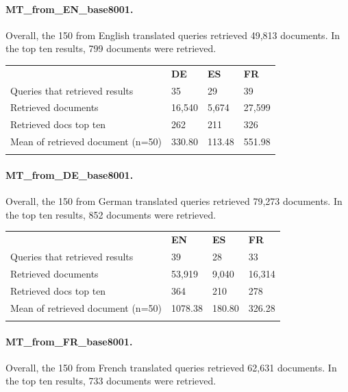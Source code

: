 \documentclass[a4paper,11pt]{article}
\begin{document}
\paragraph{MT\_from\_EN\_base8001.}
Overall, the 150 from English translated queries retrieved 49,813 documents. In the top ten results, 799 documents were retrieved.

\begin{table}[h]
\centering
\begin{tabularx}{0.81\textwidth}{llll}
\cmidrule{1-4}
\addlinespace
& \textbf{DE} & \textbf{ES} & \textbf{FR} \\
\addlinespace
\cmidrule{1-4}
\addlinespace
Queries that retrieved results & 35 & 29 & 39 \\
Retrieved documents & 16,540 & 5,674 & 27,599 \\
Retrieved docs top ten & 262 & 211 & 326 \\
Mean of retrieved document (n=50) & 330.80 & 113.48 & 551.98 \\
\addlinespace
\cmidrule{1-4}
\end{tabularx}
\label{result_list_analysis_mt_en}
\end{table}

\paragraph{MT\_from\_DE\_base8001.}
Overall, the 150 from German translated queries retrieved 79,273 documents. In the top ten results, 852 documents were retrieved.

\begin{table}[!h]
\centering
\begin{tabularx}{0.81\textwidth}{llll}
\cmidrule{1-4}
\addlinespace
& \textbf{EN} & \textbf{ES} & \textbf{FR} \\
\addlinespace
\cmidrule{1-4}
\addlinespace
Queries that retrieved results & 39 & 28 & 33 \\
Retrieved documents & 53,919 & 9,040 & 16,314 \\
Retrieved docs top ten & 364 & 210 & 278 \\
Mean of retrieved document (n=50) & 1078.38 & 180.80 & 326.28 \\
\addlinespace
\cmidrule{1-4}
\end{tabularx}
\label{result_list_analysis_mt_de}
\end{table}

\paragraph{MT\_from\_FR\_base8001.}
Overall, the 150 from French translated queries retrieved 62,631 documents. In the top ten results, 733 documents were retrieved.
\end{document}
